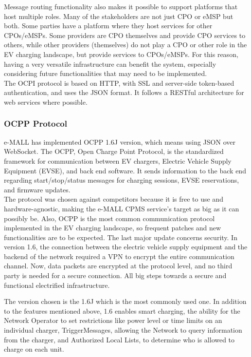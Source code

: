 \documentclass[12pt]{report}
\begin{document}
\noindent Message routing functionality also makes it possible to support platforms that host multiple roles. Many of the stakeholders are not just CPO or eMSP but both. Some parties have a platform where they host services for other CPOs/eMSPs. Some providers are CPO themselves and provide CPO services to others, while other providers (themselves) do not play a CPO or other role in the EV charging landscape, but provide services to CPOs/eMSPs.\newline
For this reason, having a very versatile infrastructure can benefit the system, especially considering future functionalities that may need to be implemented.\\

\noindent The OCPI protocol is based on HTTP, with SSL and server-side token-based authentication, and uses the JSON format. It follows a RESTful architecture for web services where possible.\\


\subsubsection{OCPP Protocol}
e-MALL has implemented OCPP 1.6J version, which means using JSON over WebSocket.\newline
The OCPP, Open Charge Point Protocol, is the standardized framework for communication between EV chargers, Electric Vehicle Supply Equipment (EVSE), and back end software. It sends information to the back end regarding start/stop/status messages for charging sessions, EVSE reservations, and firmware updates.\\

\noindent The protocol was chosen against competitors because it is free to use and hardware-agnostic, making the e-MALL CPMS service's target as big as it can possibly be. Also, OCPP is the most common communication protocol implemented in the EV charging landscape, so frequent patches and new functionalities are to be expected.\newline
The last major update concerns security. In version 1.6, the connection between the electric vehicle supply equipment and the backend of the network required a VPN to encrypt the entire communication channel. Now, data packets are encrypted at the protocol level, and no third party is needed for a secure connection. All big steps towards a secure and functional electrified infrastructure.\newline

\noindent The version chosen is the 1.6J which is the most commonly used one. In addition to the features mentioned above, 1.6 enables smart charging, the ability for the Network Operator to set restrictions like power level or time limits on an individual charger, TriggerMessages, allowing the Network to query information from the charger, and Authorized Local Lists, to determine who is allowed to charge on each unit.
\end{document}
